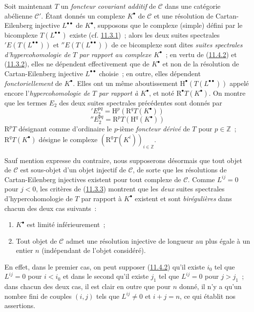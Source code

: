 \begin{env}[11.4.3]
\label{0.11.4.3-fr}
Soit maintenant $T$ un \emph{foncteur covariant additif} de $\mathcal C$
dans une catégorie abélienne $\mathcal C'$. Étant donnés un complexe
$K^\bullet$ de $\mathcal C$ et une résolution de Cartan-Eilenberg injective
$L^{\bullet\bullet}$ de $K^\bullet$, supposons que le complexe (simple) défini
par le bicomplexe $T(L^{\bullet\bullet})$ existe
(cf. \hyperref[0.11.3.1-fr]{11.3.1})~; alors les deux suites spectrales
$'E(T(L^{\bullet\bullet}))$ et $''E(T(L^{\bullet\bullet}))$ de ce bicomplexe
sont dites \emph{suites spectrales d'hypercohomologie de $T$ par rapport au
complexe $K^\bullet$}~; en vertu de
(\hyperref[0.11.4.2-fr]{11.4.2}) et
(\hyperref[0.11.3.2-fr]{11.3.2}), elles ne dépendent effectivement que de
$K^\bullet$ et non de la résolution de Cartan-Eilenberg injective
$L^{\bullet\bullet}$ choisie~; en outre, elles dépendent
\emph{fonctoriellement} de $K^\bullet$. Elles ont un même aboutissement
$\mathrm H^\bullet(T(L^{\bullet\bullet}))$ appelé encore
l'\emph{hypercohomologie de $T$ par rapport à $K^\bullet$}, et noté
$\mathrm R^\bullet T(K^\bullet)$. On montre que les termes $E_2$ des deux
suites spectrales précédentes sont donnés par
\[
  \label{0.11.4.3.1-fr}
  'E_2^{pq}=\mathrm H^p(\mathrm R^qT(K^\bullet))
  \tag{11.4.3.1}
\]
\[
  \label{0.11.4.3.2-fr}
  ''E_2^{pq}=\mathrm R^pT(\mathrm H^q(K^\bullet))
  \tag{11.4.3.2}
\]
$\mathrm R^pT$ désignant comme d'ordinaire le $p$-ième \emph{foncteur
dérivé} de $T$ pour $p\in\mathbb Z$~; $\mathrm R^qT(K^\bullet)$ désigne le
complexe $(\mathrm R^qT(K^i))_{i\in\mathbb Z}$.

\label{0.11.4.4-fr}
Sauf mention expresse du contraire, nous supposerons désormais que tout objet
de $\mathcal C$ est sous-objet d'un objet injectif de $\mathcal C$, de sorte
que les résolutions de Cartan-Eilenberg injectives existent pour tout complexe
de $\mathcal C$. Comme $L^{ij}=0$ pour $j<0$, les critères de
(\hyperref[0.11.3.3-fr]{11.3.3}) montrent que les \emph{deux} suites
spectrales d'hypercohomologie de $T$ par rapport à $K^\bullet$ existent et
sont \emph{birégulières} dans chacun des deux cas suivants~:
\begin{enumerate}
  \item[$1^\circ$] $K^\bullet$ est limité inférieurement~;
  \item[$2^\circ$] Tout objet de $\mathcal C$ admet une résolution injective
    de longueur au plus égale à un entier $n$ (indépendant de l'objet
    considéré).
\end{enumerate}
En effet, dans le premier cas, on peut supposer
(\hyperref[0.11.4.2-fr]{11.4.2}) qu'il existe $i_0$ tel que $L^{ij}=0$ pour
$i<i_0$ et dans le second qu'il existe $j_1$ tel que $L^{ij}=0$ pour $j>j_1$~;
dans chacun des deux cas, il est clair en outre que pour $n$ donné, il n'y a
qu'un nombre fini de couples $(i,j)$ tels que $L^{ij}\neq0$ et $i+j=n$, ce
qui établit nos assertions.


\end{env}
